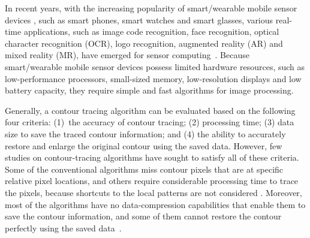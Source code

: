 \documentclass[sensors,article,accept,moreauthors,pdftex,10pt,a4paper]{mdpi}
\begin{document}

In recent years, with the increasing popularity of smart/wearable mobile sensor devices \cite{Aroca2013Wearable}, such as smart phones, smart watches and smart glasses, various real-time applications, such as image code recognition, face recognition, optical character recognition (OCR), logo recognition, augmented reality (AR) and mixed reality (MR), have emerged for sensor computing~\cite{Wakaumi20062D,Brodic2010Basic,Kim2006Rapid,Tian2010RealTime,Zhang2012Robust}. Because smart/wearable mobile sensor devices possess limited hardware resources, such as low-performance processors, small-sized memory, low-resolution displays and low battery capacity, they require simple and fast algorithms for image processing. 


Generally, a contour tracing algorithm can be evaluated based on the following four criteria: (1)~the accuracy of contour tracing; (2) processing time; (3) data size to save the traced contour information; and (4) the ability to accurately restore and enlarge the original contour using the saved data. However, few studies on contour-tracing algorithms have sought to satisfy all of these criteria. Some of the conventional algorithms miss contour pixels that are at specific relative pixel locations, and others require considerable processing time to trace the pixels, because shortcuts to the local patterns are not considered \cite{Cheong2006Improved,Cheong2006Advanced}. Moreover, most of the algorithms have no data-compression capabilities that enable them to save the contour information, and some of them cannot restore the contour perfectly using the saved data~\cite{Miyatake1997Contour}. 
\end{document}
